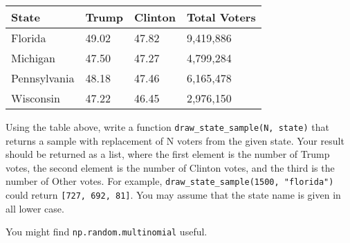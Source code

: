 \documentclass[11pt]{article}
\begin{document}
\begin{longtable}[]{@{}llll@{}}
\toprule
State & Trump & Clinton & Total Voters\tabularnewline
\midrule
\endhead
Florida & 49.02 & 47.82 & 9,419,886\tabularnewline
Michigan & 47.50 & 47.27 & 4,799,284\tabularnewline
Pennsylvania & 48.18 & 47.46 & 6,165,478\tabularnewline
Wisconsin & 47.22 & 46.45 & 2,976,150\tabularnewline
\bottomrule
\end{longtable}

Using the table above, write a function
\texttt{draw\_state\_sample(N,\ state)} that returns a sample with
replacement of N voters from the given state. Your result should be
returned as a list, where the first element is the number of Trump
votes, the second element is the number of Clinton votes, and the third
is the number of Other votes. For example,
\texttt{draw\_state\_sample(1500,\ "florida")} could return
\texttt{{[}727,\ 692,\ 81{]}}. You may assume that the state name is
given in all lower case.

You might find \texttt{np.random.multinomial} useful.
\end{document}
